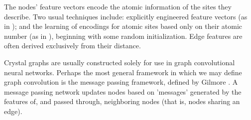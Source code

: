 \documentclass[twoside,twocolumn,9pt]{article}
\begin{document}



The nodes' feature vectors encode the atomic information of the sites they describe. Two usual techniques include: explicitly engineered feature vectors (as in \cite{cgcnn}); and the learning of encodings for atomic sites based only on their atomic number (as in \cite{megnet}), beginning with some random initialization. Edge features are often derived exclusively from their distance.







Crystal graphs are usually constructed solely for use in graph convolutional neural networks. Perhaps the most general framework in which we may define graph convolution is the message passing framework, defined by Gilmore \cite{mpnn}.
A message passing network updates nodes based on 'messages' generated by the features of, and passed through, neighboring nodes (that is, nodes sharing an edge).%
\end{document}
